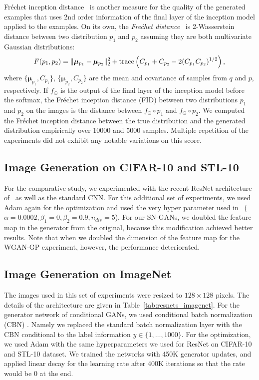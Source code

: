 \documentclass{article}
\newcommand{\bmmu}{{\bm \mu}}
\begin{document}
Fr\'echet inception distance~\cite[]{heusel2017gans} is another measure for the quality of the generated examples that uses 2nd order information of the final layer of the inception model applied to the examples.
On its own, the \textit{Fre\'chet distance}~\cite{dowson1982frechet} is 2-Wasserstein distance between two distribution $p_1$ and $p_2$ assuming they are both multivariate Gaussian distributions:
\begin{align}
	F(p_1, p_2) = \|\bmmu_{p_1}- \bmmu_{p_2}\|_2^2 + {\rm trace}\left({C_{{p_1}} + C_{p_2} - 2(C_{p_1}C_{p_2})^{1/2}}\right),
\end{align}
where $\{\bmmu_{p_1}, C_{p_1}\}$, $\{\bmmu_{p_2}, C_{p_2}\}$ are the mean and covariance of samples from $q$ and $p$, respectively.
If $f_{\ominus} $ is the output of the final layer of the inception model before the softmax, the Fr\'echet inception distance (FID) between two distributions $p_1$ and $p_2$ on the images is the distance between $f_{\ominus}\circ p_1$ and  $f_{\ominus}\circ p_2$.
We computed the Fr\'echet inception distance between the true distribution and the generated distribution empirically over 10000 and 5000 samples.
Multiple repetition of the experiments did not exhibit any notable variations on this score.

%
\subsection{Image Generation on CIFAR-10 and STL-10}
For the comparative study, we experimented with the recent ResNet architecture of~\cite{gulrajani2017improved} as well as the standard CNN.
For this additional set of experiments, we used Adam again for the optimization and used the very hyper parameter used in~\cite{gulrajani2017improved} ($\alpha=0.0002, \beta_1=0, \beta_2=0.9,　n_{dis}=5$).
For our SN-GANs, we doubled the feature map in the generator from the original, because this modification achieved better results.
Note that when we doubled the dimension of the feature map for the WGAN-GP experiment, however, the performance deteriorated.

\subsection{\label{apdsubsec:exp_imagenet}Image Generation on ImageNet}
The images used in this set of experiments were resized to $128 \times 128$ pixels.
The details of the architecture are given in Table~\ref{tab:resnets_imagenet}.
For the generator network of conditional GANs, we used conditional batch normalization (CBN) \cite[]{dumoulin2016learned, de2017modulating}.
Namely we replaced the standard batch normalization layer with the CBN conditional to the label information $y \in \{1,\dots,1000\}$.
For the optimization, we used Adam with the same hyperparameters we used for ResNet on CIFAR-10 and STL-10 dataset.
We trained the networks with 450K generator updates, and applied linear decay for the learning rate after 400K iterations so that the rate would be 0 at the end.
\end{document}
